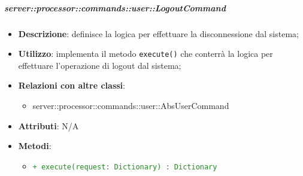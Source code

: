         \subparagraph{server::processor::commands::user::LogoutCommand} %
        \label{subp:bdsm_app_server_processor_commands_user_LogoutCommand}
        \begin{itemize}
          \item \textbf{Descrizione}: definisce la logica per effettuare la disconnessione dal sistema;
          \item \textbf{Utilizzo}: implementa il metodo \texttt{execute()} che conterrà la logica per effettuare l'operazione di logout dal sistema;
          \item \textbf{Relazioni con altre classi}:
            \begin{itemize}
              \item server::processor::commands::user::AbsUserCommand
            \end{itemize}
          \item \textbf{Attributi}: N/A
          \item \textbf{Metodi}:
          \begin{itemize}
              \item \textcolor{forestgreen}{\texttt{+ execute(request: Dictionary) : Dictionary}}
          \end{itemize}
        \end{itemize}

